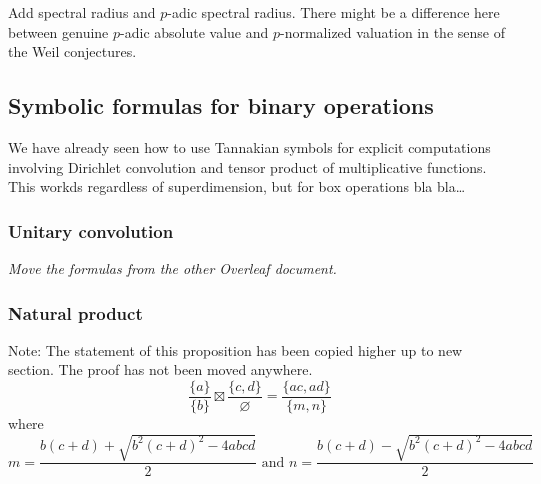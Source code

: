 
Add spectral radius and $p$-adic spectral radius. There might be a difference here between genuine $p$-adic absolute value and $p$-normalized valuation in the sense of the Weil conjectures.

\subsection{Symbolic formulas for binary operations}

We have already seen how to use Tannakian symbols for explicit computations involving Dirichlet convolution and tensor product of multiplicative functions. This workds regardless of superdimension, but for box operations bla bla\ldots


\subsubsection{Unitary convolution}


\emph{Move the formulas from the other Overleaf document.}


\subsubsection{Natural product}



\begin{proposition}
Note: The statement of this proposition has been copied higher up to new section. The proof has not been moved anywhere.
$$\frac{\{a\}}{\{b\}} \boxtimes \frac{\{c,d\}}{\varnothing} = \frac{\{ac,ad\}}{\{m, n\}}$$
where 
$$m = \frac{b(c+d) + \sqrt{b^2 (c+d)^2 - 4abcd}}{2} \text{\ and\ } n = \frac{b(c+d) - \sqrt{b^2 (c+d)^2 - 4abcd}}{2}$$
\end{proposition}

